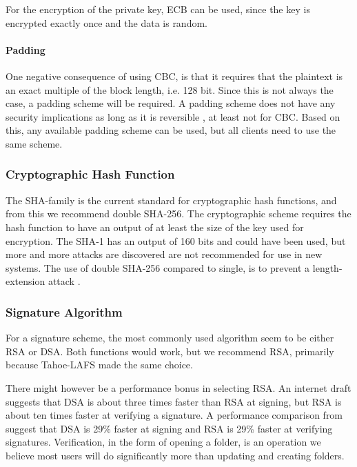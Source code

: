 \documentclass[pdftex,english,10pt,b5paper,twoside]{book}
\begin{document}
For the encryption of the private key, \ac{ECB} can be used, since the key is
encrypted exactly once and the data is random.


\paragraph{Padding} One negative consequence of using \ac{CBC}, is that it
requires that the plaintext is an exact multiple of the block length, i.e.  128
bit. Since this is not always the case, a padding scheme will be required.  A
padding scheme does not have any security implications as long as it is
reversible \cite{schneier}, at least not for \ac{CBC}. Based on this, any
available padding scheme can be used, but all clients need to use the same
scheme.

\subsubsection{Cryptographic Hash Function}

The \ac{SHA}-family is the current standard for cryptographic hash functions,
and from this we recommend double \ac{SHA}-256. The cryptographic scheme
requires the hash function to have an output of at least the size of the key
used for encryption. The \ac{SHA}-1 has an output of 160 bits and could have
been used, but more and more attacks are discovered %
are not recommended for use in new systems. The use of double \ac{SHA}-256
compared to single, is to prevent a length-extension attack \cite{schneier}.


\subsubsection{Signature Algorithm}

For a signature scheme, the most commonly used algorithm seem to be either
\ac{RSA} or \ac{DSA}.  Both functions would work, but we recommend \ac{RSA},
primarily because Tahoe-\ac{LAFS} made the same choice.

There might however be a performance bonus in selecting \ac{RSA}. An internet
draft \cite{dsa_sha2} suggests that \ac{DSA} is about three times faster than
\ac{RSA} at signing, but \ac{RSA} is about ten times faster at verifying a
signature. A performance comparison from \citet{msdn_perf} suggest that
\ac{DSA} is 29\% faster at signing and \ac{RSA} is 29\% faster at verifying
signatures. Verification, in the form of opening a folder, is an operation we
believe most users will do significantly more than updating and creating
folders.
\end{document}
